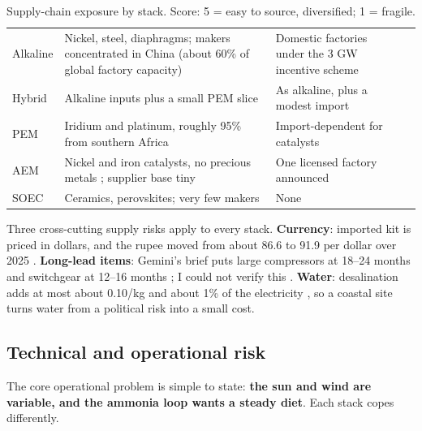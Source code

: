 \begin{table}[H]\centering\tablefont
\caption{Supply-chain exposure by stack. Score: 5 = easy to source, diversified; 1 = fragile.}
\begin{tabularx}{\textwidth}{@{}p{22mm} L L c@{}}
\toprule
{} &  &  & \\ \midrule
Alkaline & Nickel, steel, diaphragms; makers concentrated in China (about 60\% of global factory capacity) \cite{argus2026} & Domestic factories under the 3 GW incentive scheme \cite{rw2025} & \\
Hybrid & Alkaline inputs plus a small PEM slice & As alkaline, plus a modest import & \\
PEM & Iridium and platinum, roughly 95\% from southern Africa \cite{h2tech2022} & Import-dependent for catalysts & \\
AEM & Nickel and iron catalysts, no precious metals \cite{irena2020}; supplier base tiny & One licensed factory announced \cite{enki2026} & \\
SOEC & Ceramics, perovskites; very few makers & None & \\
\bottomrule
\end{tabularx}
\end{table}

Three cross-cutting supply risks apply to every stack. \textbf{Currency}: imported kit is priced in dollars, and the rupee moved from about 86.6 to 91.9 per dollar over 2025 \cite{skfert2026}. \textbf{Long-lead items}: Gemini's brief puts large compressors at 18–24 months and switchgear at 12–16 months \cite{gemini2026}; I could not verify this \confL. \textbf{Water}: desalination adds at most about \usd{}0.10/kg and about 1\% of the electricity \cite{rmi2023}, so a coastal site turns water from a political risk into a small cost. \confH

\subsection{Technical and operational risk}

The core operational problem is simple to state: \textbf{the sun and wind are variable, and the ammonia loop wants a steady diet}. Each stack copes differently.

